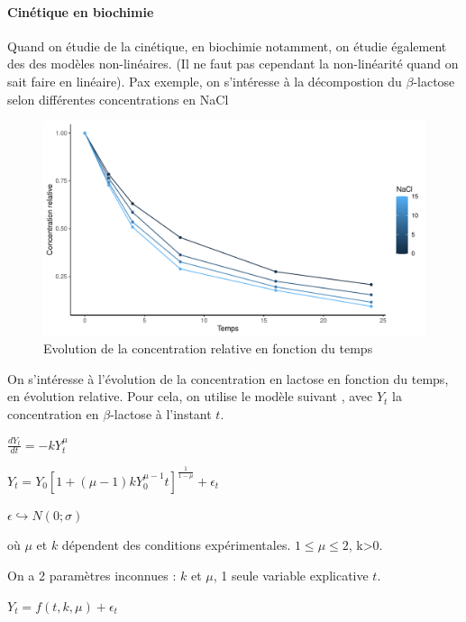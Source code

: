 \documentclass[
]{article}
\begin{document}
\hypertarget{cinuxe9tique-en-biochimie}{%
\paragraph{Cinétique en biochimie}\label{cinuxe9tique-en-biochimie}}

Quand on étudie de la cinétique, en biochimie notamment, on étudie
également des des modèles non-linéaires. (Il ne faut pas cependant la
non-linéarité quand on sait faire en linéaire). Pax exemple, on
s'intéresse à la décompostion du \(\beta\)-lactose selon différentes
concentrations en NaCl

\begin{figure}
\centering
\includegraphics{Learning_R_files/figure-latex/unnamed-chunk-37-1.pdf}
\caption{Evolution de la concentration relative en fonction du temps}
\end{figure}

On s'intéresse à l'évolution de la concentration en lactose en fonction
du temps, en évolution relative. Pour cela, on utilise le modèle suivant
, avec \(Y_{t}\) la concentration en \(\beta\)-lactose à l'instant
\(t\).

\begin{center}
$\frac{dY_{t}}{dt}=-kY_{t}^{\mu}$

$Y_{t}=Y_{0}[1+( \mu-1)kY_{0}^{\mu-1}t]^{\frac{1}{1- \mu}}+ \epsilon_{t}$

$\epsilon \hookrightarrow N(0; \sigma)$
\end{center}

où \(\mu\) et \(k\) dépendent des conditions expérimentales.
\(1 \le \mu \le 2\), k\textgreater0.

On a 2 paramètres inconnues : \(k\) et \(\mu\), 1 seule variable
explicative \(t\).

\begin{center}
$Y_{t}=f(t,k, \mu)+ \epsilon_{t}$
\end{center}
\end{document}
